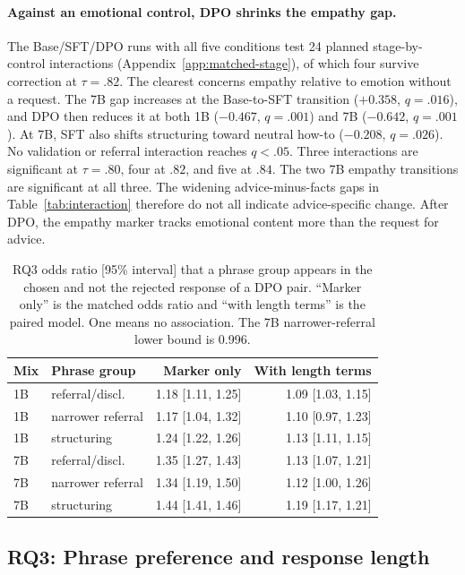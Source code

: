 \documentclass[11pt]{article}
\begin{document}
\paragraph{Against an emotional control, DPO shrinks the empathy gap.}
The Base/SFT/DPO runs with all five conditions test 24 planned
stage-by-control interactions (Appendix~\ref{app:matched-stage}), of which
four survive correction at $\tau=.82$. The clearest concerns empathy relative
to emotion without a request. The 7B gap increases at the
Base-to-SFT transition ($+0.358$, $q=.016$), and DPO then reduces
it at both 1B ($-0.467$, $q=.001$) and 7B ($-0.642$, $q=.001$). At 7B, SFT
also shifts structuring toward neutral how-to ($-0.208$, $q=.026$). No
validation or referral interaction reaches $q<.05$. Three interactions are
significant at $\tau=.80$, four at $.82$, and five at $.84$. The two 7B
empathy transitions are significant at all three. The widening
advice-minus-facts gaps in Table~\ref{tab:interaction} therefore do not all
indicate advice-specific change. After DPO, the empathy marker tracks
emotional content more than the request for advice.

\begin{table}[t]
\centering
\small
\setlength{\tabcolsep}{3pt}
\begin{tabular}{@{}llrr@{}}
\toprule
Mix & Phrase group & Marker only & With length terms \\
\midrule
1B & referral/discl. & 1.18 [1.11, 1.25] & 1.09 [1.03, 1.15] \\
1B & narrower referral & 1.17 [1.04, 1.32] & 1.10 [0.97, 1.23] \\
1B & structuring & 1.24 [1.22, 1.26] & 1.13 [1.11, 1.15] \\
\midrule
7B & referral/discl. & 1.35 [1.27, 1.43] & 1.13 [1.07, 1.21] \\
7B & narrower referral & 1.34 [1.19, 1.50] & 1.12 [1.00, 1.26] \\
7B & structuring & 1.44 [1.41, 1.46] & 1.19 [1.17, 1.21] \\
\bottomrule
\end{tabular}
\caption{RQ3 odds ratio [95\% interval] that a phrase group appears in the
chosen and not the rejected response of a DPO pair. ``Marker only'' is the
matched odds ratio and ``with length terms'' is the paired model. One means no
association. The 7B narrower-referral lower bound is 0.996.}
\label{tab:dpo}
\end{table}

\subsection{RQ3: Phrase preference and response length}
\label{sec:datalayers}
\end{document}
